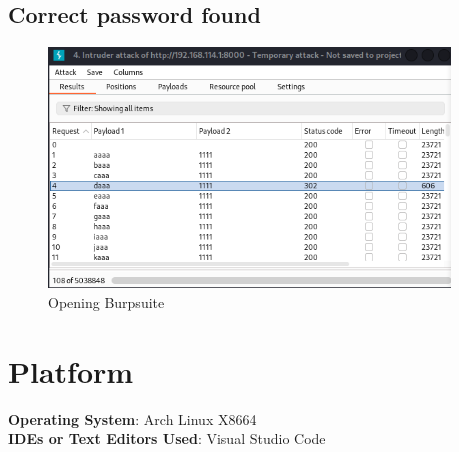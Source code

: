 \documentclass[11pt]{article}
\begin{document}
\subsection{Correct password found}




\begin{figure}[H]
    \centering
    \includegraphics[width=0.95\textwidth]{burpsuite (12).png}
    \caption{Opening Burpsuite}
    \label{fig:1}
\end{figure}


\section{Platform}
\textbf{Operating System}: Arch Linux X8664 \\
\textbf{IDEs or Text Editors Used}: Visual Studio Code\\
\end{document}
